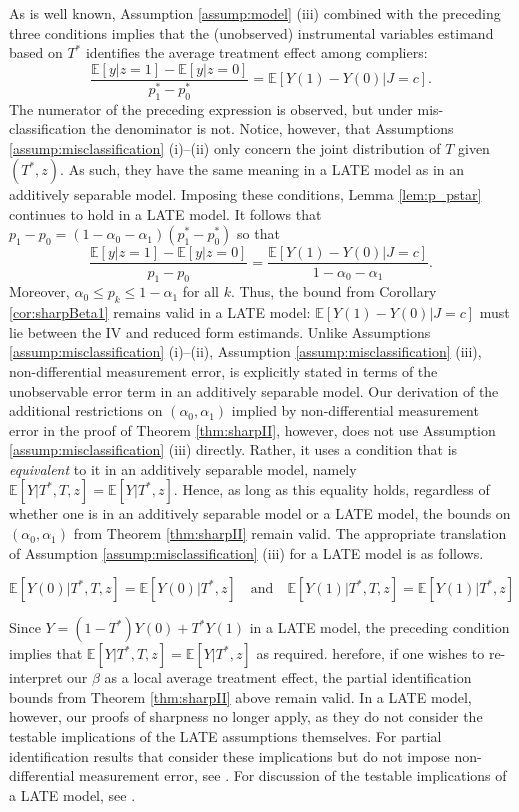 As is well known, Assumption \ref{assump:model} (iii) combined with the preceding three conditions implies that the (unobserved) instrumental variables estimand based on $T^*$ identifies the average treatment effect among compliers:
\[
  \frac{\mathbb{E}[y|z=1] - \mathbb{E}[y|z=0]}{p^*_1 - p^*_0} = \mathbb{E}[Y(1) - Y(0)|J=c].
\]
The numerator of the preceding expression is observed, but under mis-classification the denominator is not.
Notice, however, that Assumptions \ref{assump:misclassification} (i)--(ii) only concern the joint distribution of $T$ given $(T^*,z)$.
As such, they have the same meaning in a LATE model as in an additively separable model.
Imposing these conditions, Lemma \ref{lem:p_pstar} continues to hold in a LATE model.
It follows that $p_1 - p_0 = (1 - \alpha_0 - \alpha_1) (p_1^* - p_0^*)$ so that
\[
  \frac{\mathbb{E}[y|z=1] - \mathbb{E}[y|z=0]}{p_1 - p_0} = \frac{\mathbb{E}[Y(1) - Y(0)|J=c]}{1 - \alpha_0 - \alpha_1}.
\]
Moreover, $\alpha_0 \leq p_k \leq 1 - \alpha_1$ for all $k$.
Thus, the bound from Corollary \ref{cor:sharpBeta1} remains valid in a LATE model: $\mathbb{E}[Y(1) - Y(0)|J=c]$ must lie between the IV and reduced form estimands.
Unlike Assumptions \ref{assump:misclassification} (i)--(ii), Assumption \ref{assump:misclassification} (iii), non-differential measurement error, is explicitly stated in terms of the unobservable error term in an additively separable model.
Our derivation of the additional restrictions on $(\alpha_0, \alpha_1)$ implied by non-differential measurement error in the proof of Theorem \ref{thm:sharpII}, however, does not use Assumption \ref{assump:misclassification} (iii) directly.
Rather, it uses a condition that is \emph{equivalent} to it in an additively separable model, namely $\mathbb{E}[Y|T^*,T,z] = \mathbb{E}[Y|T^*,z]$.
Hence, as long as this equality holds, regardless of whether one is in an additively separable model or a LATE model, the bounds on $(\alpha_0, \alpha_1)$ from Theorem \ref{thm:sharpII} remain valid.
The appropriate translation of Assumption \ref{assump:misclassification} (iii) for a LATE model is as follows.
\begin{assump}
  \[
    \mathbb{E}[Y(0)|T^*,T,z] = \mathbb{E}[Y(0)|T^*,z] \quad \mbox{and} \quad \mathbb{E}[Y(1)|T^*,T,z] = \mathbb{E}[Y(1)|T^*,z]
  \]
\end{assump}
Since $Y = (1 - T^*)Y(0) + T^* Y(1)$ in a LATE model, the preceding condition implies that $\mathbb{E}[Y|T^*,T,z] = \mathbb{E}[Y|T^*,z]$ as required.
herefore, if one wishes to re-interpret our $\beta$ as a local average treatment effect, the partial identification bounds from Theorem \ref{thm:sharpII} above remain valid.
In a LATE model, however, our proofs of sharpness no longer apply, as they do not consider the testable implications of the LATE assumptions themselves.
For partial identification results that consider these implications but do not impose non-differential measurement error, see \cite{Ura}.
For discussion of the testable implications of a LATE model, see \cite{kitagawa}.


